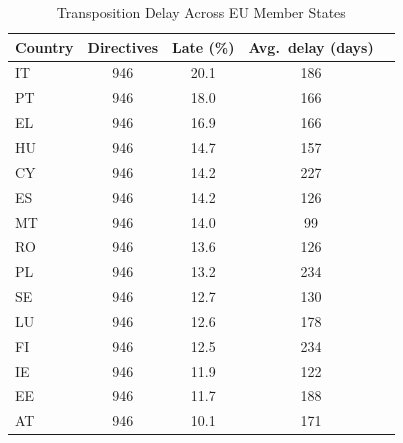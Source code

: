 \begin{table}[t]
\centering
\caption{Transposition Delay Across EU Member States}
\label{tab:delay}
\begin{tabular}{lcccc}
\toprule
Country & Directives & Late (\%) & Avg.\ delay (days) \\
\midrule
IT & 946 & 20.1 & 186 \\
PT & 946 & 18.0 & 166 \\
EL & 946 & 16.9 & 166 \\
HU & 946 & 14.7 & 157 \\
CY & 946 & 14.2 & 227 \\
ES & 946 & 14.2 & 126 \\
MT & 946 & 14.0 & 99 \\
RO & 946 & 13.6 & 126 \\
PL & 946 & 13.2 & 234 \\
SE & 946 & 12.7 & 130 \\
LU & 946 & 12.6 & 178 \\
FI & 946 & 12.5 & 234 \\
IE & 946 & 11.9 & 122 \\
EE & 946 & 11.7 & 188 \\
AT & 946 & 10.1 & 171 \\
\bottomrule
\end{tabular}
\par{}
\end{table}
